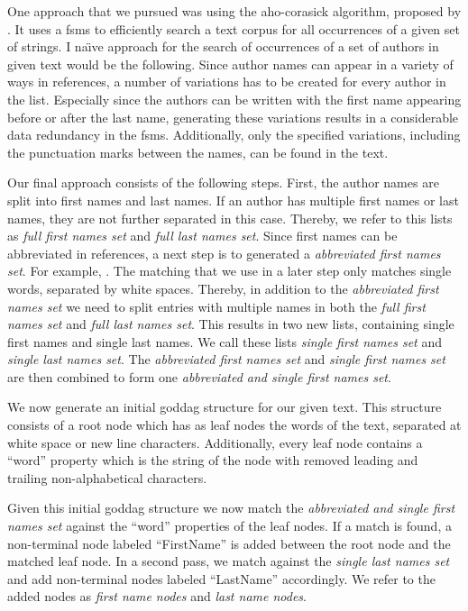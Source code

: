 One approach that we pursued was using the \gls{aho-corasick algorithm}, proposed by \citet{aho1975efficient}.
It uses a \glspl{fsm} to efficiently search a text corpus for all occurrences of a given set of strings.
I na{\"{\i}}ve approach for the search of occurrences of a set of authors in given text would be the following.
Since author names can appear in a variety of ways in references, a number of variations has to be created for every author in the list.
Especially since the authors can be written with the first name appearing before or after the last name, generating these variations results in a considerable data redundancy in the \glspl{fsm}.
Additionally, only the specified variations, including the punctuation marks between the names, can be found in the text.

Our final approach consists of the following steps.
First, the author names are split into first names and last names.
If an author has multiple first names or last names, they are not further separated in this case.
Thereby, we refer to this lists as \textit{full first names set} and \textit{full last names set}.
Since first names can be abbreviated in references, a next step is to generated a \textit{abbreviated first names set}.
For example, .
The matching that we use in a later step only matches single words, separated by white spaces.
Thereby, in addition to the \textit{abbreviated first names set} we need to split entries with multiple names in both the \textit{full first names set} and \textit{full last names set}.
This results in two new lists, containing single first names and single last names.
We call these lists \textit{single first names set} and \textit{single last names set}.
The \textit{abbreviated first names set} and \textit{single first names set} are then combined to form one \textit{abbreviated and single first names set}.

We now generate an initial \gls{goddag} structure for our given text.
This structure consists of a root node which has as leaf nodes the words of the text, separated at white space or new line characters.
Additionally, every leaf node contains a ``word'' property which is the string of the node with removed leading and trailing non-alphabetical characters.

Given this initial \gls{goddag} structure we now match the \textit{abbreviated and single first names set} against the ``word'' properties of the leaf nodes.
If a match is found, a non-terminal node labeled ``FirstName'' is added between the root node and the matched leaf node.
In a second pass, we match against the \textit{single last names set} and add non-terminal nodes labeled ``LastName'' accordingly.
We refer to the added nodes as \textit{first name nodes} and \textit{last name nodes}.

